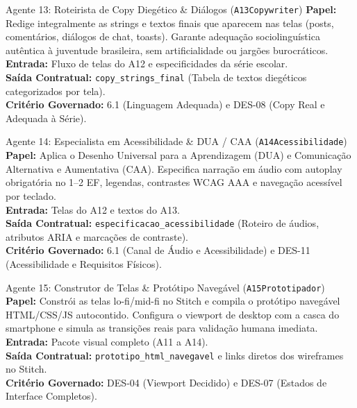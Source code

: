 \documentclass[11pt,a4paper]{article}
\begin{document}
\begin{agentbox}{Agente 13: Roteirista de Copy Dieg\'etico \& Di\'alogos (\texttt{A13Copywriter})}
\textbf{Papel:} Redige integralmente as strings e textos finais que aparecem nas telas (posts, coment\'arios, di\'alogos de chat, toasts). Garante adequa\c{c}\~ao sociolingu\'istica aut\^entica \`a juventude brasileira, sem artificialidade ou jarg\~oes burocr\'aticos.\\
\textbf{Entrada:} Fluxo de telas do A12 e especificidades da s\'erie escolar.\\
\textbf{Sa\'ida Contratual:} \texttt{copy\_strings\_final} (Tabela de textos dieg\'eticos categorizados por tela).\\
\textbf{Crit\'erio Governado:} 6.1 (Linguagem Adequada) e DES-08 (Copy Real e Adequada \`a S\'erie).
\end{agentbox}

\begin{agentbox}{Agente 14: Especialista em Acessibilidade \& DUA / CAA (\texttt{A14Acessibilidade})}
\textbf{Papel:} Aplica o Desenho Universal para a Aprendizagem (DUA) e Comunica\c{c}\~ao Alternativa e Aumentativa (CAA). Especifica narra\c{c}\~ao em \'audio com autoplay obrigat\'oria no 1\textordmasculine{}--2\textordmasculine{} EF, legendas, contrastes WCAG AAA e navega\c{c}\~ao acess\'ivel por teclado.\\
\textbf{Entrada:} Telas do A12 e textos do A13.\\
\textbf{Sa\'ida Contratual:} \texttt{especificacao\_acessibilidade} (Roteiro de \'audios, atributos ARIA e marca\c{c}\~oes de contraste).\\
\textbf{Crit\'erio Governado:} 6.1 (Canal de \'Audio e Acessibilidade) e DES-11 (Acessibilidade e Requisitos F\'isicos).
\end{agentbox}

\begin{agentbox}{Agente 15: Construtor de Telas \& Prot\'otipo Naveg\'avel (\texttt{A15Prototipador})}
\textbf{Papel:} Constr\'oi as telas lo-fi/mid-fi no Stitch e compila o prot\'otipo naveg\'avel HTML/CSS/JS autocontido. Configura o viewport de desktop com a casca do smartphone e simula as transi\c{c}\~oes reais para valida\c{c}\~ao humana imediata.\\
\textbf{Entrada:} Pacote visual completo (A11 a A14).\\
\textbf{Sa\'ida Contratual:} \texttt{prototipo\_html\_navegavel} e links diretos dos wireframes no Stitch.\\
\textbf{Crit\'erio Governado:} DES-04 (Viewport Decidido) e DES-07 (Estados de Interface Completos).
\end{agentbox}
\end{document}
